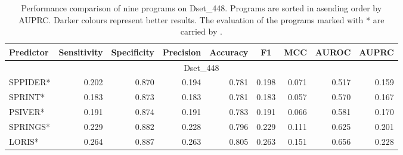 \begin{table}[htbp]
  \centering
  \caption{Performance comparison of nine programs on Dset\_448. Programs are sorted in asending order by AUPRC. Darker colours represent better results. The evaluation of the programs marked with \** are carried by \cite{zhang2019scriber}.}

    \begin{tabular}{lrrrrrrrr}
    \toprule
    \multicolumn{1}{|l}{Predictor} & \multicolumn{1}{c}{Sensitivity} & \multicolumn{1}{c}{Specificity} & \multicolumn{1}{c}{Precision} & \multicolumn{1}{c}{Accuracy} & \multicolumn{1}{c}{F1} & \multicolumn{1}{c}{MCC} & \multicolumn{1}{c}{AUROC} & \multicolumn{1}{c|}{AUPRC} \\
    \midrule
    \multicolumn{9}{|c|}{Dset\_448} \\
    \midrule
    SPPIDER* & \cellcolor[rgb]{ .933,  .953,  .922}0.202 & 0.870 & \cellcolor[rgb]{ .961,  .973,  .957}0.194 & 0.781 & \cellcolor[rgb]{ .949,  .965,  .937}0.198 & \cellcolor[rgb]{ .957,  .969,  .949}0.071 & 0.517 & 0.159 \\
    SPRINT* & 0.183 & \cellcolor[rgb]{ .937,  .953,  .925}0.873 & 0.183 & 0.781 & 0.183 & 0.057 & \cellcolor[rgb]{ .839,  .882,  .812}0.570 & \cellcolor[rgb]{ .973,  .98,  .965}0.167 \\
    PSIVER* & \cellcolor[rgb]{ .973,  .98,  .969}0.191 & \cellcolor[rgb]{ .918,  .937,  .902}0.874 & \cellcolor[rgb]{ .973,  .98,  .969}0.191 & \cellcolor[rgb]{ .973,  .98,  .969}0.783 & \cellcolor[rgb]{ .973,  .98,  .969}0.191 & \cellcolor[rgb]{ .973,  .98,  .969}0.066 & \cellcolor[rgb]{ .808,  .859,  .773}0.581 & \cellcolor[rgb]{ .961,  .973,  .953}0.170 \\
    SPRINGS* & \cellcolor[rgb]{ .839,  .882,  .808}0.229 & \cellcolor[rgb]{ .745,  .812,  .698}0.882 & \cellcolor[rgb]{ .843,  .886,  .812}0.228 & \cellcolor[rgb]{ .792,  .847,  .753}0.796 & \cellcolor[rgb]{ .839,  .882,  .808}0.229 & \cellcolor[rgb]{ .835,  .878,  .804}0.111 & \cellcolor[rgb]{ .675,  .761,  .612}0.625 & \cellcolor[rgb]{ .843,  .886,  .816}0.201 \\
    LORIS* & \cellcolor[rgb]{ .714,  .792,  .659}0.264 & \cellcolor[rgb]{ .635,  .733,  .569}0.887 & \cellcolor[rgb]{ .718,  .792,  .663}0.263 & \cellcolor[rgb]{ .667,  .757,  .604}0.805 & \cellcolor[rgb]{ .718,  .792,  .663}0.263 & \cellcolor[rgb]{ .71,  .788,  .655}0.151 & \cellcolor[rgb]{ .58,  .694,  .502}0.656 & \cellcolor[rgb]{ .741,  .812,  .694}0.228 \\

\end{tabular}
\end{table}
